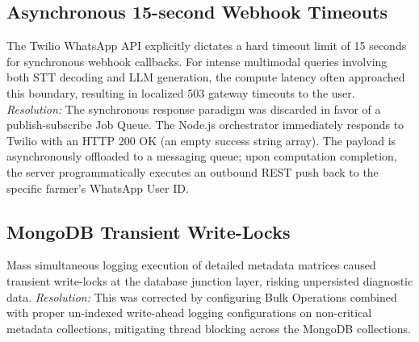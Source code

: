 \documentclass[12pt, a4paper]{report}
\begin{document}
\subsection*{Asynchronous 15-second Webhook Timeouts}
The Twilio WhatsApp API explicitly dictates a hard timeout limit of 15 seconds for synchronous webhook callbacks. For intense multimodal queries involving both STT decoding and LLM generation, the compute latency often approached this boundary, resulting in localized 503 gateway timeouts to the user.
\textit{Resolution:} The synchronous response paradigm was discarded in favor of a publish-subscribe Job Queue. The Node.js orchestrator immediately responds to Twilio with an HTTP 200 OK (an empty success string array). The payload is asynchronously offloaded to a messaging queue; upon computation completion, the server programmatically executes an outbound REST push back to the specific farmer's WhatsApp User ID.

\subsection*{MongoDB Transient Write-Locks}
Mass simultaneous logging execution of detailed metadata matrices caused transient write-locks at the database junction layer, risking unpersisted diagnostic data.
\textit{Resolution:} This was corrected by configuring Bulk Operations combined with proper un-indexed write-ahead logging configurations on non-critical metadata collections, mitigating thread blocking across the MongoDB collections.
\end{document}
